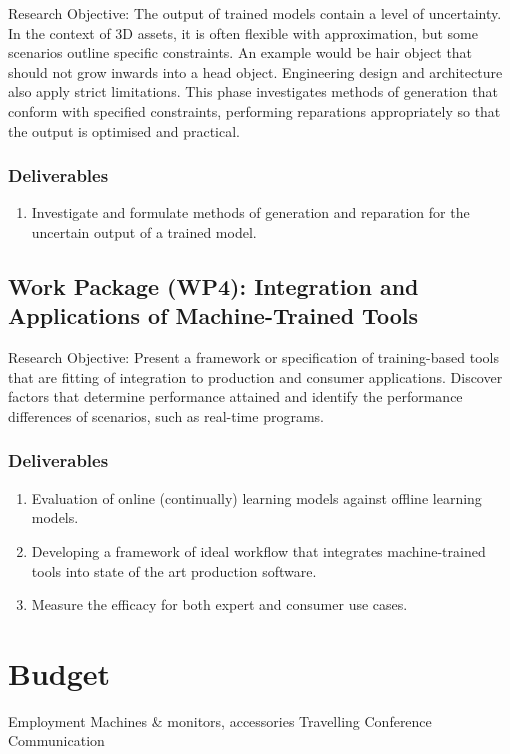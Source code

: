 \documentclass[a4paper, fontsize=15pt, onecolumn]{article} %
\numberwithin{equation}{section} %
\numberwithin{figure}{section} %
\numberwithin{table}{section} %
\begin{document}
Research Objective: The output of trained models contain a level of uncertainty. In the context of 3D assets, it is often flexible with approximation, but some scenarios outline specific constraints. An example would be hair object that should not grow inwards into a head object. Engineering design and architecture also apply strict limitations. This phase investigates methods of generation that conform with specified constraints, performing reparations appropriately so that the output is optimised and practical.

\subsubsection{Deliverables}
\begin{enumerate}
	\item Investigate and formulate methods of generation and reparation for the uncertain output of a trained model.
\end{enumerate}

\subsection{Work Package (WP4): Integration and Applications of Machine-Trained Tools}
Research Objective: Present a framework or specification of training-based tools that are fitting of integration to production and consumer applications. Discover factors that determine performance attained and identify the performance differences of scenarios, such as real-time programs.

\subsubsection{Deliverables}
\begin{enumerate}
	\item Evaluation of online (continually) learning models against offline learning models.
	\item Developing a framework of ideal workflow that integrates machine-trained tools into state of the art production software.
	\item Measure the efficacy for both expert and consumer use cases.
\end{enumerate}
	


\newpage

\section*{Budget}
Employment
Machines \& monitors, accessories
Travelling
Conference
Communication
\end{document}
